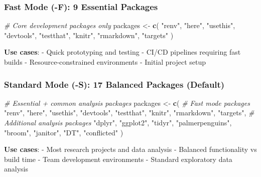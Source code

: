 \documentclass[
]{article}
\newenvironment{Shaded}{\begin{snugshade}}{\end{snugshade}}
\newcommand{\CommentTok}[1]{\textcolor[rgb]{0.56,0.35,0.01}{\textit{#1}}}
\newcommand{\FunctionTok}[1]{\textcolor[rgb]{0.13,0.29,0.53}{\textbf{#1}}}
\newcommand{\NormalTok}[1]{#1}
\newcommand{\OtherTok}[1]{\textcolor[rgb]{0.56,0.35,0.01}{#1}}
\newcommand{\StringTok}[1]{\textcolor[rgb]{0.31,0.60,0.02}{#1}}
\begin{document}
\subsubsection{Fast Mode (-F): 9 Essential
Packages}\label{fast-mode--f-9-essential-packages}

\begin{Shaded}
\begin{Highlighting}[]
\CommentTok{\# Core development packages only}
\NormalTok{packages }\OtherTok{\textless{}{-}} \FunctionTok{c}\NormalTok{(}
  \StringTok{"renv"}\NormalTok{, }\StringTok{"here"}\NormalTok{, }\StringTok{"usethis"}\NormalTok{, }\StringTok{"devtools"}\NormalTok{,}
  \StringTok{"testthat"}\NormalTok{, }\StringTok{"knitr"}\NormalTok{, }\StringTok{"rmarkdown"}\NormalTok{, }\StringTok{"targets"}
\NormalTok{)}
\end{Highlighting}
\end{Shaded}

\textbf{Use cases}: - Quick prototyping and testing - CI/CD pipelines
requiring fast builds - Resource-constrained environments - Initial
project setup

\subsubsection{Standard Mode (-S): 17 Balanced Packages
(Default)}\label{standard-mode--s-17-balanced-packages-default}

\begin{Shaded}
\begin{Highlighting}[]
\CommentTok{\# Essential + common analysis packages}
\NormalTok{packages }\OtherTok{\textless{}{-}} \FunctionTok{c}\NormalTok{(}
  \CommentTok{\# Fast mode packages}
  \StringTok{"renv"}\NormalTok{, }\StringTok{"here"}\NormalTok{, }\StringTok{"usethis"}\NormalTok{, }\StringTok{"devtools"}\NormalTok{, }\StringTok{"testthat"}\NormalTok{,}
  \StringTok{"knitr"}\NormalTok{, }\StringTok{"rmarkdown"}\NormalTok{, }\StringTok{"targets"}\NormalTok{,}
  \CommentTok{\# Additional analysis packages}
  \StringTok{"dplyr"}\NormalTok{, }\StringTok{"ggplot2"}\NormalTok{, }\StringTok{"tidyr"}\NormalTok{, }\StringTok{"palmerpenguins"}\NormalTok{,}
  \StringTok{"broom"}\NormalTok{, }\StringTok{"janitor"}\NormalTok{, }\StringTok{"DT"}\NormalTok{, }\StringTok{"conflicted"}
\NormalTok{)}
\end{Highlighting}
\end{Shaded}

\textbf{Use cases}: - Most research projects and data analysis -
Balanced functionality vs build time - Team development environments -
Standard exploratory data analysis
\end{document}
